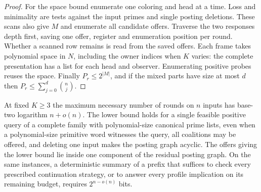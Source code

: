 \begin{proof}
For the space bound enumerate one coloring and head at a time.
Loss and minimality are tests against the input primes and single
posting deletions. These scans also give $M$ and enumerate all
candidate offers. Traverse the two responses depth first, saving one
offer, register and enumeration position per round. Whether a
scanned row remains is read from the saved offers. Each frame takes
polynomial space in $N$, including the owner indices when $K$ varies:
the complete presentation has a list for each head and observer.
Enumerating positive probes reuses the space. Finally
$P_r\le 2^{|M|}$, and if the mixed parts have size at most $d$ then
$P_r\le\sum_{j=0}^{d}\binom nj$.
\end{proof}

\begin{proposition}
\label{core:prop:winning-offer-rounds}
At fixed $K\ge3$ the maximum necessary number of rounds on $n$
inputs has base-two logarithm $n+o(n)$. The lower bound holds for
a single feasible positive query of a complete family with
polynomial-size canonical prime lists, even when a polynomial-size
primitive word witnesses the query, all coalitions may be offered,
and deleting one input makes the posting graph acyclic. The offers
giving the lower bound lie inside one component of the residual
posting graph. On the same instances, a deterministic summary of a
prefix that suffices to check every prescribed continuation strategy,
or to answer every profile implication on its remaining budget,
requires $2^{n-o(n)}$ bits.
\end{proposition}
